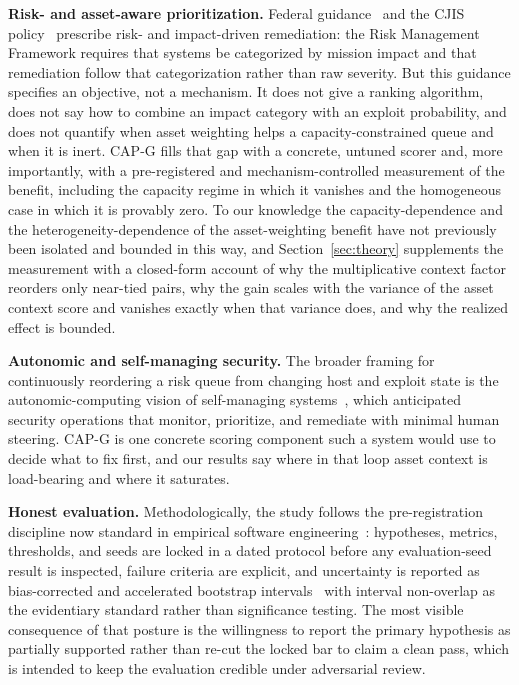 \textbf{Risk- and asset-aware prioritization.} Federal guidance~\cite{nist80053,fips199,%
nist80060} and the CJIS policy~\cite{cjis2023} prescribe risk- and impact-driven remediation: the
Risk Management Framework requires that systems be categorized by mission impact and that
remediation follow that categorization rather than raw severity. But this guidance specifies an
objective, not a mechanism. It does not give a ranking algorithm, does not say how to combine an
impact category with an exploit probability, and does not quantify when asset weighting helps a
capacity-constrained queue and when it is inert. CAP-G fills that gap with a concrete, untuned
scorer and, more importantly, with a pre-registered and mechanism-controlled measurement of the
benefit, including the capacity regime in which it vanishes and the homogeneous case in which it
is provably zero. To our knowledge the capacity-dependence and the heterogeneity-dependence of the
asset-weighting benefit have not previously been isolated and bounded in this way,
and Section~\ref{sec:theory} supplements the measurement with a closed-form account
of why the multiplicative context factor reorders only near-tied pairs, why the
gain scales with the variance of the asset context score and vanishes exactly when
that variance does, and why the realized effect is bounded.

\textbf{Autonomic and self-managing security.} The broader framing for continuously reordering a
risk queue from changing host and exploit state is the autonomic-computing vision of self-managing
systems~\cite{kephart2003vision}, which anticipated security operations that monitor, prioritize,
and remediate with minimal human steering. CAP-G is one concrete scoring component such a system
would use to decide what to fix first, and our results say where in that loop asset context is
load-bearing and where it saturates.

\textbf{Honest evaluation.} Methodologically, the study follows the pre-registration discipline
now standard in empirical software engineering~\cite{wohlin2012experimentation}: hypotheses,
metrics, thresholds, and seeds are locked in a dated protocol before any evaluation-seed result is
inspected, failure criteria are explicit, and uncertainty is reported as bias-corrected and
accelerated bootstrap intervals~\cite{efron1987bca,efron1994introduction} with interval non-overlap
as the evidentiary standard rather than significance testing. The most visible consequence of that
posture is the willingness to report the primary hypothesis as partially supported rather than
re-cut the locked bar to claim a clean pass, which is intended to keep the evaluation credible
under adversarial review.

